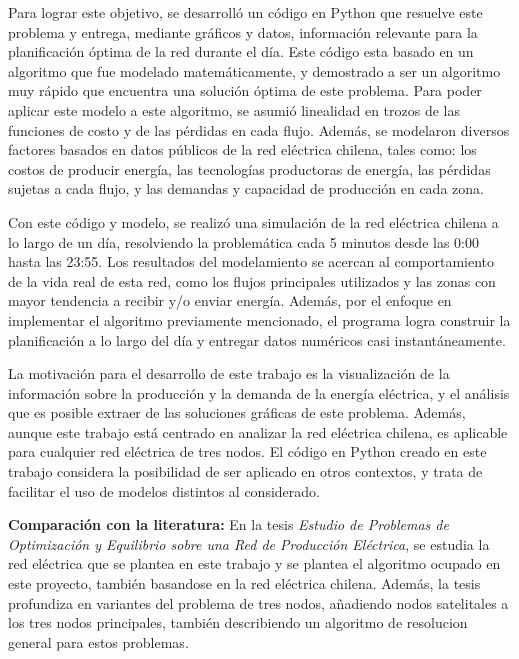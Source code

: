 \documentclass[12pt,twoside]{article}
\begin{document}
	Para lograr este objetivo, se desarroll\'o un c\'odigo en Python que resuelve este problema y entrega, mediante gr\'aficos y datos, informaci\'on relevante para la planificaci\'on \'optima de la red durante el d\'ia. Este c\'odigo esta basado en un algoritmo que fue modelado matemáticamente, y demostrado a ser un algoritmo muy r\'apido que encuentra una soluci\'on \'optima de este problema. Para poder aplicar este modelo a este algoritmo, se asumi\'o linealidad en trozos de las funciones de costo y de las p\'erdidas en cada flujo. Adem\'as, se modelaron diversos factores basados en datos p\'ublicos de la red el\'ectrica chilena, tales como: los costos de producir energ\'ia, las tecnolog\'ias productoras de energ\'ia, las pérdidas sujetas a cada flujo, y las demandas y capacidad de producción en cada zona.
	
	Con este c\'odigo y modelo, se realiz\'o una simulaci\'on de la red el\'ectrica chilena a lo largo de un d\'ia, resolviendo la problem\'atica cada 5 minutos desde las 0:00 hasta las 23:55. Los resultados del modelamiento se acercan al comportamiento de la vida real de esta red, como los flujos principales utilizados y las zonas con mayor tendencia a recibir y/o enviar energ\'ia. Adem\'as, por el enfoque en implementar el algoritmo previamente mencionado, el programa logra construir la planificaci\'on a lo largo del d\'ia y entregar datos num\'ericos casi instant\'aneamente.
	
	La motivación para el desarrollo de este trabajo es la visualizaci\'on de la información sobre la producción y la demanda de la energía eléctrica, y el an\'alisis que es posible extraer de las soluciones gr\'aficas de este problema. Además, aunque este trabajo est\'a centrado en analizar la red el\'ectrica chilena, es aplicable para cualquier red el\'ectrica de tres nodos. El c\'odigo en Python creado en este trabajo considera la posibilidad de ser aplicado en otros contextos, y trata de facilitar el uso de modelos distintos al considerado.
	
	\textbf{Comparaci\'on con la literatura:} En la tesis \textit{Estudio de Problemas de Optimizaci\'on y Equilibrio sobre una Red de Producci\'on El\'ectrica}, se estudia la red el\'ectrica que se plantea en este trabajo y se plantea el algoritmo ocupado en este proyecto, tambi\'en basandose en la red el\'ectrica chilena. Adem\'as, la tesis profundiza en variantes del problema de tres nodos, a\~{n}adiendo nodos satelitales a los tres nodos principales, tambi\'en describiendo un algoritmo de resolucion general para estos problemas.
	
\end{document}
